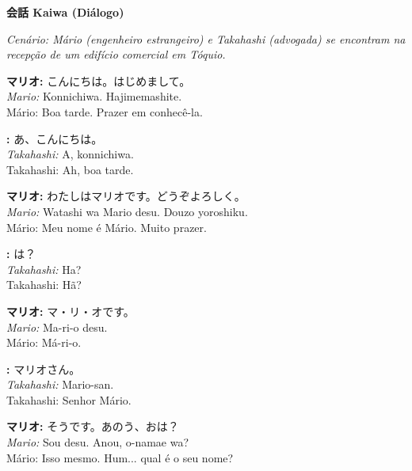 \documentclass[12pt,a4paper]{article}
\begin{document}
\newpage

\begin{center}
    {\LARGE\bfseries 会話 Kaiwa (Diálogo)}
\end{center}

\textit{Cenário: Mário (engenheiro estrangeiro) e Takahashi (advogada) se encontram na recepção de um edifício comercial em Tóquio.}

\vspace{0.8em}

\textbf{マリオ:} こんにちは。はじめまして。\\
\textit{Mario:} Konnichiwa. Hajimemashite.\\
Mário: Boa tarde. Prazer em conhecê-la.

\vspace{0.5em}

\textbf{:} あ、こんにちは。\\
\textit{Takahashi:} A, konnichiwa.\\
Takahashi: Ah, boa tarde.

\vspace{0.5em}

\textbf{マリオ:} わたしはマリオです。どうぞよろしく。\\
\textit{Mario:} Watashi wa Mario desu. Douzo yoroshiku.\\
Mário: Meu nome é Mário. Muito prazer.

\vspace{0.5em}

\textbf{:} は？\\
\textit{Takahashi:} Ha?\\
Takahashi: Hã?

\vspace{0.5em}

\textbf{マリオ:} マ・リ・オです。\\
\textit{Mario:} Ma-ri-o desu.\\
Mário: Má-ri-o.

\vspace{0.5em}

\textbf{:} マリオさん。\\
\textit{Takahashi:} Mario-san.\\
Takahashi: Senhor Mário.

\vspace{0.5em}

\textbf{マリオ:} そうです。あのう、おは？\\
\textit{Mario:} Sou desu. Anou, o-namae wa?\\
Mário: Isso mesmo. Hum... qual é o seu nome?
\end{document}
